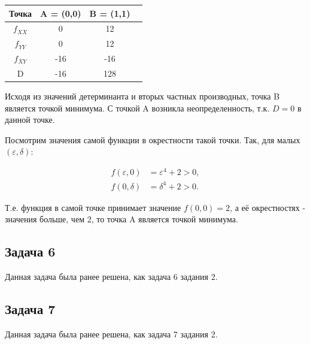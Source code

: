 \documentclass[a4paper,11pt]{article}
\begin{document}
\begin{center}
\begin{tabular}{|c|c|c|c|}
\hline 
Точка & A = (0,0) & B = (1,1) \\ 
\hline 
$f_{XX}$ &   0 &  12 \\ 
$f_{YY}$ &   0 &  12 \\ 
$f_{XY}$ & -16 & -16 \\ 
\hline 
D & -16 & 128 \\ 
\hline 
\end{tabular} 
\end{center}

Исходя из значений детерминанта и вторых частных производных, точка B является точкой минимума. С точкой A возникла неопределенность, т.к. $D = 0$ в данной точке.

Посмотрим значения самой функции в окрестности такой точки. Так, для малых $(\varepsilon, \delta)$:

\begin{align*}
f(\varepsilon, 0) & = \varepsilon^4 + 2 > 0, \\
f(0, \delta)   & = \delta^4 +2 > 0.
\end{align*}

Т.е. функция в самой точке принимает значение $f(0,0) = 2$, а её окрестностях - значения больше, чем 2, то точка A является точкой минимума.

\subsection{Задача 6}

Данная задача была ранее решена, как задача 6 задания 2.

\subsection{Задача 7}

Данная задача была ранее решена, как задача 7 задания 2.
\end{document}

